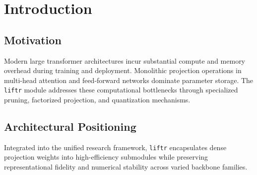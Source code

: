 \section{Introduction}

\subsection{Motivation}
Modern large transformer architectures incur substantial compute and memory overhead during training and deployment. Monolithic projection operations in multi-head attention and feed-forward networks dominate parameter storage. The \texttt{liftr} module addresses these computational bottlenecks through specialized pruning, factorized projection, and quantization mechanisms.

\subsection{Architectural Positioning}
Integrated into the unified research framework, \texttt{liftr} encapsulates dense projection weights into high-efficiency submodules while preserving representational fidelity and numerical stability across varied backbone families.

